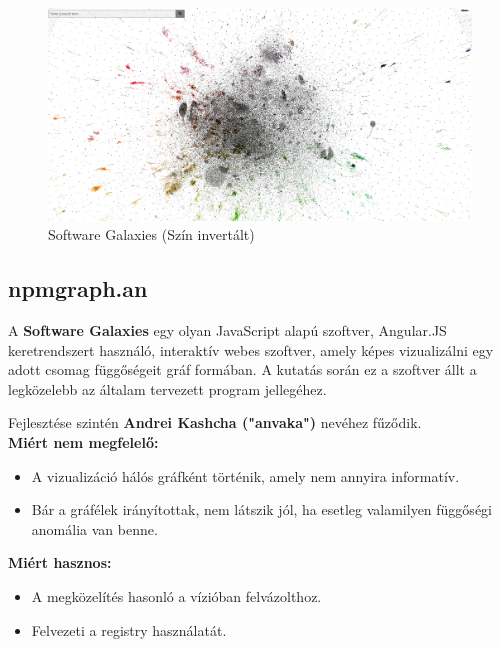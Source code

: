 	\begin{figure}[!h]
		\centering
		\includegraphics[scale=0.15]{images/anvaka_pm.png}
		\caption{Software Galaxies (Szín invertált)}
		\label{fig:sw-galaxies}
	\end{figure}
	
	\subsection{npmgraph.an}
	
	A \textbf{Software Galaxies} egy olyan JavaScript alapú szoftver, Angular.JS keretrendszert használó, interaktív webes szoftver, amely képes vizualizálni egy adott csomag függőségeit gráf formában. A kutatás során ez a szoftver állt a legközelebb az általam tervezett program jellegéhez.
	
	Fejlesztése szintén \textbf{Andrei Kashcha ("anvaka")} nevéhez fűződik.
	\\
	
	\textbf{Miért nem megfelelő:}
	\begin{itemize}
		\item A vizualizáció hálós gráfként történik, amely nem annyira informatív.
		\item Bár a gráfélek irányítottak, nem látszik jól, ha esetleg valamilyen függőségi anomália van benne.
	\end{itemize}
	
	\textbf{Miért hasznos:}
	\begin{itemize}
		\item A megközelítés hasonló a vízióban felvázolthoz.
		\item Felvezeti a registry használatát.
	\end{itemize}
	
	\begin{flushright}
		\cite{anvaka-npmgraph}
	\end{flushright}
	
